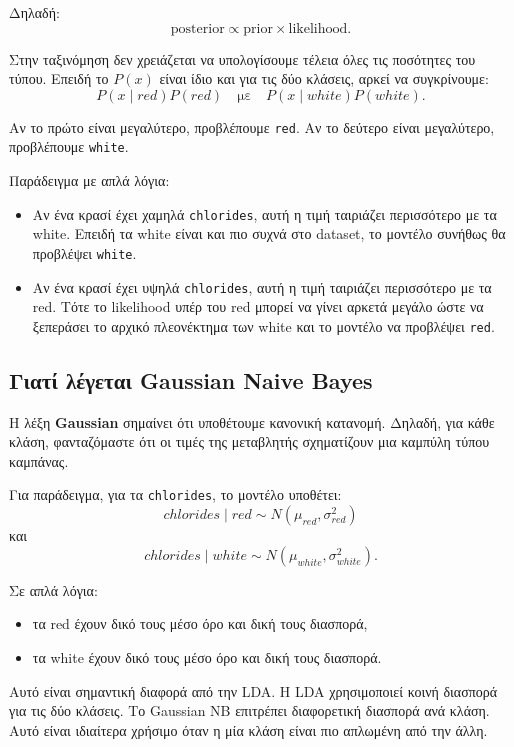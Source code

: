 \documentclass[11pt,a4paper]{article}
\newcommand{\code}[1]{\texttt{#1}}
\begin{document}
Δηλαδή:
\[
\text{posterior}
\propto
\text{prior}
\times
\text{likelihood}.
\]

Στην ταξινόμηση δεν χρειάζεται να υπολογίσουμε τέλεια όλες τις ποσότητες του
τύπου. Επειδή το \(P(x)\) είναι ίδιο και για τις δύο κλάσεις, αρκεί να
συγκρίνουμε:
\[
P(x\mid red)P(red)
\quad \text{με} \quad
P(x\mid white)P(white).
\]

Αν το πρώτο είναι μεγαλύτερο, προβλέπουμε \code{red}. Αν το δεύτερο είναι
μεγαλύτερο, προβλέπουμε \code{white}.

Παράδειγμα με απλά λόγια:
\begin{itemize}
    \item Αν ένα κρασί έχει χαμηλά \code{chlorides}, αυτή η τιμή ταιριάζει
    περισσότερο με τα white. Επειδή τα white είναι και πιο συχνά στο dataset,
    το μοντέλο συνήθως θα προβλέψει \code{white}.

    \item Αν ένα κρασί έχει υψηλά \code{chlorides}, αυτή η τιμή ταιριάζει
    περισσότερο με τα red. Τότε το likelihood υπέρ του red μπορεί να γίνει
    αρκετά μεγάλο ώστε να ξεπεράσει το αρχικό πλεονέκτημα των white και το
    μοντέλο να προβλέψει \code{red}.
\end{itemize}

\subsection{Γιατί λέγεται Gaussian Naive Bayes}

Η λέξη \textbf{Gaussian} σημαίνει ότι υποθέτουμε κανονική κατανομή. Δηλαδή,
για κάθε κλάση, φανταζόμαστε ότι οι τιμές της μεταβλητής σχηματίζουν μια
καμπύλη τύπου καμπάνας.

Για παράδειγμα, για τα \code{chlorides}, το μοντέλο υποθέτει:
\[
chlorides \mid red \sim N(\mu_{red}, \sigma^2_{red})
\]
και
\[
chlorides \mid white \sim N(\mu_{white}, \sigma^2_{white}).
\]

Σε απλά λόγια:
\begin{itemize}
    \item τα red έχουν δικό τους μέσο όρο και δική τους διασπορά,
    \item τα white έχουν δικό τους μέσο όρο και δική τους διασπορά.
\end{itemize}

Αυτό είναι σημαντική διαφορά από την LDA. Η LDA χρησιμοποιεί κοινή διασπορά
για τις δύο κλάσεις. Το Gaussian NB επιτρέπει διαφορετική διασπορά ανά κλάση.
Αυτό είναι ιδιαίτερα χρήσιμο όταν η μία κλάση είναι πιο απλωμένη από την άλλη.
\end{document}
